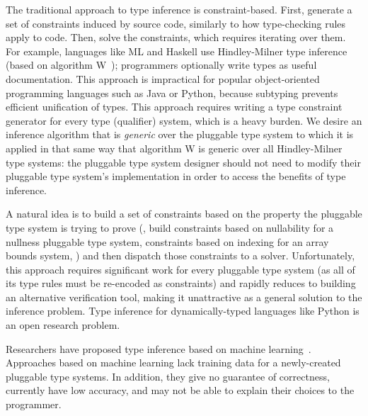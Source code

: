 The traditional approach to type inference is constraint-based.
First, generate a set of constraints induced by source code, similarly to
how type-checking rules apply to code.
Then, solve the constraints, which requires iterating over them.
%
For example, languages like ML and Haskell use
Hindley-Milner type inference (based on algorithm
W~\cite{DamasM1982}); programmers optionally write types
as useful documentation.
%
This approach is impractical for popular object-oriented programming
languages such as Java or Python, because subtyping prevents efficient
unification of types.
%
This approach requires writing a type constraint generator for every type
(qualifier) system, which is a heavy burden.
%
We desire an
inference algorithm that is \emph{generic} over the pluggable type system
to which it is applied in that same way that algorithm W is generic over
all Hindley-Milner type systems: the pluggable type system designer should not need to
modify their pluggable type system's implementation in order to access
the benefits of type inference.



A natural idea is to build a set of constraints based on the property the
pluggable type system is trying to prove (\eg, build constraints based on
nullability for a nullness pluggable type system, constraints based on indexing
for an array bounds system, \etc) and then dispatch those constraints
to a solver.
%
Unfortunately, this approach requires significant work for every pluggable type
system (as all of its type rules must be re-encoded as constraints) and rapidly
reduces to building an alternative verification tool, making it unattractive as
a general solution to the inference problem.
%
Type inference for dynamically-typed languages like Python is an open
research problem. 

Researchers have proposed type inference based on machine
learning~\cite{xu2016python,peng2022static}.  Approaches based on machine
learning lack training data for a newly-created pluggable type systems.  In
addition, they give no guarantee of correctness, currently have low
accuracy, and may not be able to explain their choices to the programmer.

